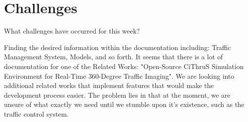 \section{Challenges}

What challenges have occurred for this week?

Finding the desired information within the documentation including: Traffic Management System, Models, and so forth.
It seems that there is a lot of documentation for one of the Related Works: "Open-Source CiThruS Simulation Environment for Real-Time 360-Degree Traffic Imaging".
We are looking into additional related works that implement features that would make the development process easier.
The problem lies in that at the moment, we are unsure of what exactly we need until we stumble upon it's existence, such as the traffic control system.